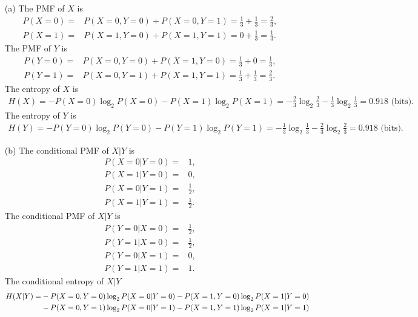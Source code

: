 \documentclass{assignment}
\begin{document}
\begin{sol}
    \begin{itemize}
        \item[(a)] The PMF of $X$ is
        \begin{align}
            P(X=0)=&P(X=0,Y=0)+P(X=0,Y=1)=\frac{1}{3}+\frac{1}{3}=\frac{2}{3},\\
            P(X=1)=&P(X=1,Y=0)+P(X=1,Y=1)=0+\frac{1}{3}=\frac{1}{3}.
        \end{align}
        The PMF of $Y$ is
        \begin{align}
            P(Y=0)=&P(X=0,Y=0)+P(X=1,Y=0)=\frac{1}{3}+0=\frac{1}{3},\\
            P(Y=1)=&P(X=0,Y=1)+P(X=1,Y=1)=\frac{1}{3}+\frac{1}{3}=\frac{2}{3}.
        \end{align}
        The entropy of $X$ is
        \begin{align}
            H(X)=-P(X=0)\log_2P(X=0)-P(X=1)\log_2P(X=1)=-\frac{2}{3}\log_2\frac{2}{3}-\frac{1}{3}\log_2\frac{1}{3}=0.918\text{ (bits)}.
        \end{align}
        The entropy of $Y$ is
        \begin{align}
            H(Y)=-P(Y=0)\log_2P(Y=0)-P(Y=1)\log_2P(Y=1)=-\frac{1}{3}\log_2\frac{1}{3}-\frac{2}{3}\log_2\frac{2}{3}=0.918\text{ (bits)}.
        \end{align}
        \item[(b)] The conditional PMF of $X\vert Y$ is
        \begin{align}
            P(X=0\vert Y=0)=&1,\\
            P(X=1\vert Y=0)=&0,\\
            P(X=0\vert Y=1)=&\frac{1}{2},\\
            P(X=1\vert Y=1)=&\frac{1}{2}.
        \end{align}
        The conditional PMF of $X\vert Y$ is
        \begin{align}
            P(Y=0\vert X=0)=&\frac{1}{2},\\
            P(Y=1\vert X=0)=&\frac{1}{2},\\
            P(Y=0\vert X=1)=&0,\\
            P(Y=1\vert X=1)=&1.
        \end{align}
        The conditional entropy of $X\vert Y$
        \begin{align}
            \notag H(X\vert Y)=&-P(X=0,Y=0)\log_2P(X=0\vert Y=0)-P(X=1,Y=0)\log_2P(X=1\vert Y=0)\\
            \notag&-P(X=0,Y=1)\log_2P(X=0\vert Y=1)-P(X=1,Y=1)\log_2P(X=1\vert Y=1)\\

\end{align}
\end{itemize}
\end{sol}
\end{document}
